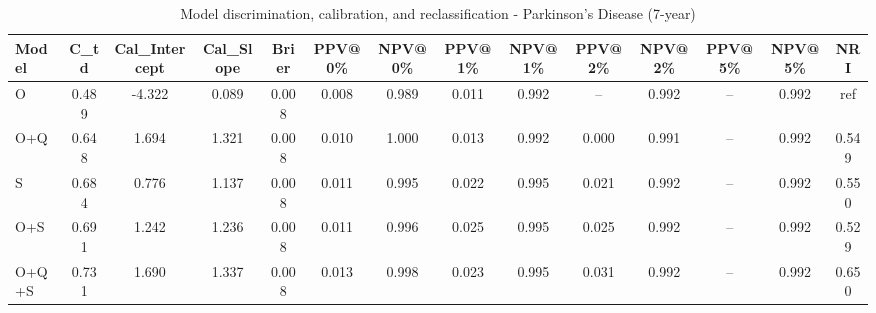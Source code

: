 \begin{table}[htbp]
\centering
\small
\caption{Model discrimination, calibration, and reclassification - Parkinson's Disease (7-year)}
\label{tab:perf_pd_7y}
\begin{tabular}{lccccccccccccc}
\toprule
Model & C\_td & Cal\_Intercept & Cal\_Slope & Brier & PPV@0\% & NPV@0\% & PPV@1\% & NPV@1\% & PPV@2\% & NPV@2\% & PPV@5\% & NPV@5\% & NRI \\
\midrule
O & 0.489 & -4.322 & 0.089 & 0.008 & 0.008 & 0.989 & 0.011 & 0.992 & -- & 0.992 & -- & 0.992 & ref \\
O+Q & 0.648 & 1.694 & 1.321 & 0.008 & 0.010 & 1.000 & 0.013 & 0.992 & 0.000 & 0.991 & -- & 0.992 & 0.549 \\
S & 0.684 & 0.776 & 1.137 & 0.008 & 0.011 & 0.995 & 0.022 & 0.995 & 0.021 & 0.992 & -- & 0.992 & 0.550 \\
O+S & 0.691 & 1.242 & 1.236 & 0.008 & 0.011 & 0.996 & 0.025 & 0.995 & 0.025 & 0.992 & -- & 0.992 & 0.529 \\
O+Q+S & 0.731 & 1.690 & 1.337 & 0.008 & 0.013 & 0.998 & 0.023 & 0.995 & 0.031 & 0.992 & -- & 0.992 & 0.650 \\
\bottomrule
\end{tabular}
\end{table}